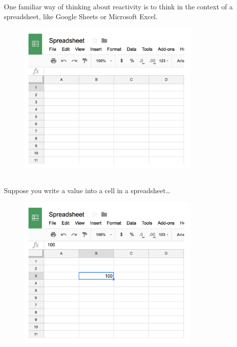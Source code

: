 \documentclass[
  letterpaper,
  DIV=11,
  numbers=noendperiod]{scrreprt}
\begin{document}
One familiar way of thinking about reactivity is to think in the context
of a spreadsheet, like Google Sheets or Microsoft Excel.

\begin{figure}

{\centering \includegraphics[width=0.8\textwidth,height=\textheight]{./images/spreadsheet-1.png}

}

\end{figure}

\hypertarget{section-11}{%
\subsection{}\label{section-11}}

Suppose you write a value into a cell in a spreadsheet\ldots{}

\begin{figure}

{\centering \includegraphics[width=0.8\textwidth,height=\textheight]{./images/spreadsheet-2.png}

}

\end{figure}
\end{document}
